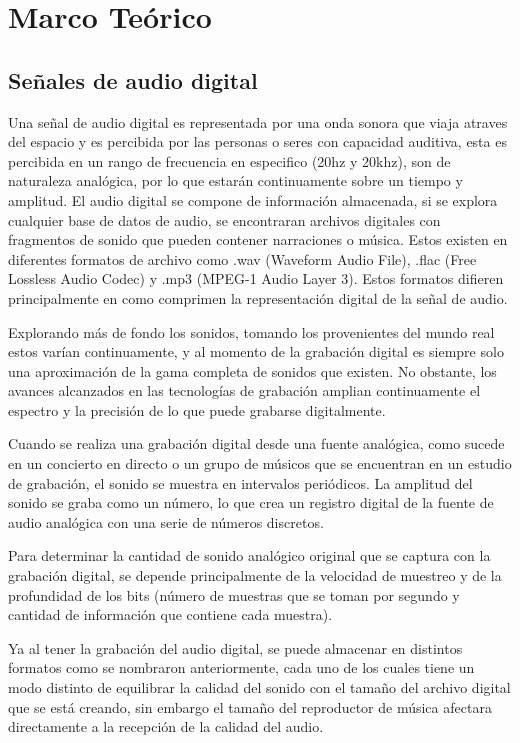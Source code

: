 \section{Marco Teórico}
\subsection{Señales de audio digital}
Una señal de audio digital es representada por una onda sonora que viaja atraves del espacio y es percibida por las personas o seres con capacidad auditiva, esta es percibida en un rango de frecuencia en especifico (20hz y 20khz), son de naturaleza analógica, por lo que estarán continuamente sobre un tiempo y amplitud.
El audio digital se compone de información almacenada, si se explora cualquier base de datos de audio, se encontraran archivos digitales con fragmentos de sonido que pueden contener narraciones o música. Estos existen en diferentes formatos de archivo como .wav (Waveform Audio File), .flac (Free Lossless Audio Codec) y .mp3 (MPEG-1 Audio Layer 3). Estos formatos difieren principalmente en como comprimen la representación digital de la señal de audio.

Explorando más de fondo los sonidos, tomando los provenientes del mundo real estos varían continuamente, y al momento de la grabación digital es siempre solo una aproximación de la gama completa de sonidos que existen. No obstante, los avances alcanzados en las tecnologías de grabación amplian continuamente el espectro y la precisión de lo que puede grabarse digitalmente.

Cuando se realiza una grabación digital desde una fuente analógica, como sucede en un concierto en directo o un grupo de músicos que se encuentran en un estudio de grabación, el sonido se muestra en intervalos periódicos. La amplitud del sonido se graba como un número, lo que crea un registro digital de la fuente de audio analógica con una serie de números discretos.

Para determinar la cantidad de sonido analógico original que se captura con la grabación digital, se depende principalmente de la velocidad de muestreo y de la profundidad de los bits (número de muestras que se toman por segundo y cantidad de información que contiene cada muestra).

Ya al tener la grabación del audio digital, se puede almacenar en distintos formatos como se nombraron anteriormente, cada uno de los cuales tiene un modo distinto de equilibrar la calidad del sonido con el tamaño del archivo digital que se está creando, sin embargo el tamaño del reproductor de música afectara directamente a la recepción de la calidad del audio.


